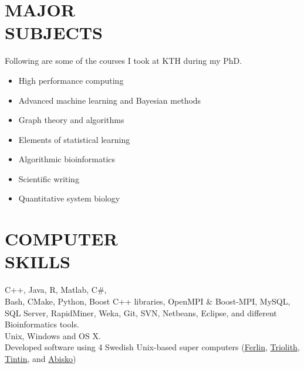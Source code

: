 \documentclass[margin, 10pt]{res} %
\begin{document}
\begin{resume}
\section{MAJOR \\ SUBJECTS}

Following are some of the courses I took at KTH during my PhD. 
\begin{itemize}
\item High performance computing
\item Advanced machine learning and Bayesian methods
\item Graph theory and algorithms
\item Elements of statistical learning
\item Algorithmic bioinformatics
\item Scientific writing
\item Quantitative system biology
\end{itemize} 


\section{COMPUTER \\ SKILLS} 

{\bf \color{Brown}{Languages:}} 
C++, Java, R, Matlab, C\#,  \\
{\bf \color{Brown}{Misc Tools:}} Bash, CMake, Python, Boost C++ libraries, OpenMPI \& Boost-MPI, MySQL, SQL Server, RapidMiner, Weka, Git, SVN, Netbeans, Eclipse, and different Bioinformatics tools. \\
{\bf \color{Brown}{Operating Systems:}} Unix, Windows and OS X.  \\
{\bf \color{Brown}{High Performance Computing Clusters:}} Developed software using 4 Swedish Unix-based super computers (\href{https://www.pdc.kth.se/resources/computers/ferlin}{Ferlin}, \href{https://www.nsc.liu.se/systems/triolith/}{Triolith}, \href{http://www.uppmax.uu.se/}{Tintin}, and \href{http://www.hpc2n.umu.se/resources/abisko}{Abisko})



\end{resume}
\end{document}
